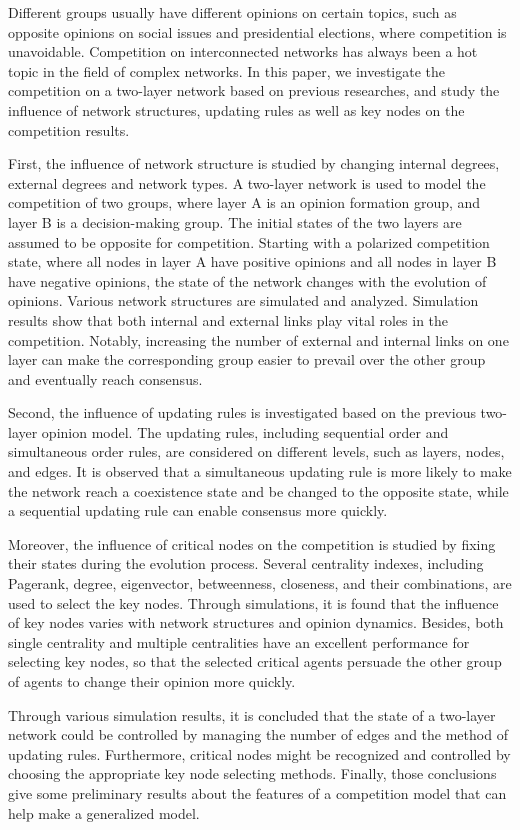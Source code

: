 \begin{englishabstract}
	
Different groups usually have different opinions on certain topics, such as opposite opinions on social issues and presidential elections, where competition is unavoidable. Competition on interconnected networks has always been a hot topic in the field of complex networks. In this paper, we investigate the competition on a two-layer network based on previous researches, and study the influence of network structures, updating rules as well as key nodes on the competition results.

First, the influence of network structure is studied by changing internal degrees, external degrees and network types. A two-layer network is used to model the competition of two groups, where layer A is an opinion formation group, and layer B is a decision-making group. The initial states of the two layers are assumed to be opposite for competition. Starting with a polarized competition state, where all nodes in layer A have positive opinions and all nodes in layer B have negative opinions, the state of the network changes with the evolution of opinions. Various network structures are simulated and analyzed. Simulation results show that both internal and external links play vital roles in the competition. Notably, increasing the number of external and internal links on one layer can make the corresponding group easier to prevail over the other group and eventually reach consensus.

Second, the influence of updating rules is investigated based on the previous two-layer opinion model. The updating rules, including sequential order and simultaneous order rules, are considered on different levels, such as layers, nodes, and edges. It is observed that a simultaneous updating rule is more likely to make the network reach a coexistence state and be changed to the opposite state, while a sequential updating rule can enable consensus more quickly.

Moreover, the influence of critical nodes on the competition is studied by fixing their states during the evolution process. Several centrality indexes, including Pagerank, degree, eigenvector, betweenness, closeness, and their combinations, are used to select the key nodes. Through simulations, it is found that the influence of key nodes varies with network structures and opinion dynamics. Besides, both single centrality and multiple centralities have an excellent performance for selecting key nodes, so that the selected critical agents persuade the other group of agents to change their opinion more quickly.

Through various simulation results, it is concluded that the state of a two-layer network could be controlled by managing the number of edges and the method of updating rules. Furthermore, critical nodes might be recognized and controlled by choosing the appropriate key node selecting methods. Finally, those conclusions give some preliminary results about the features of a competition model that can help make a generalized model.\\ 

\end{englishabstract}

